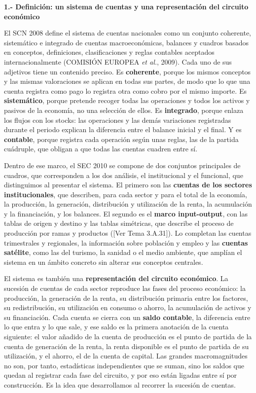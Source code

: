 \documentclass[10pt,a4paper]{article}
\newcommand{\authorfont}[1]{{\fontfamily{EBGaramond-TLF}\selectfont #1}}
\begin{document}
\textbf{1.- Definición: un sistema de cuentas y una representación del circuito económico}

El SCN 2008 define el sistema de cuentas nacionales como un conjunto coherente, sistemático e integrado de cuentas macroeconómicas, balances y cuadros basados en conceptos, definiciones, clasificaciones y reglas contables aceptados internacionalmente (COMISIÓN EUROPEA \textit{et al.}, 2009). Cada uno de sus adjetivos tiene un contenido preciso. Es \textbf{coherente}, porque los mismos conceptos y las mismas valoraciones se aplican en todas sus partes, de modo que lo que una cuenta registra como pago lo registra otra como cobro por el mismo importe. Es \textbf{sistemático}, porque pretende recoger todas las operaciones y todos los activos y pasivos de la economía, no una selección de ellos. Es \textbf{integrado}, porque enlaza los flujos con los stocks: las operaciones y las demás variaciones registradas durante el periodo explican la diferencia entre el balance inicial y el final. Y es \textbf{contable}, porque registra cada operación según unas reglas, las de la partida cuádruple, que obligan a que todas las cuentas cuadren entre sí.

Dentro de ese marco, el SEC 2010 se compone de dos conjuntos principales de cuadros, que corresponden a los dos análisis, el institucional y el funcional, que distinguimos al presentar el sistema. El primero son las \textbf{cuentas de los sectores institucionales}, que describen, para cada sector y para el total de la economía, la producción, la generación, distribución y utilización de la renta, la acumulación y la financiación, y los balances. El segundo es el \textbf{marco input-output}, con las tablas de origen y destino y las tablas simétricas, que describe el proceso de producción por ramas y productos ([\authorfont{Ver Tema 3.A.31}]). Lo completan las cuentas trimestrales y regionales, la información sobre población y empleo y las \textbf{cuentas satélite}, como las del turismo, la sanidad o el medio ambiente, que amplían el sistema en un ámbito concreto sin alterar sus conceptos centrales.

El sistema es también una \textbf{representación del circuito económico}. La sucesión de cuentas de cada sector reproduce las fases del proceso económico: la producción, la generación de la renta, su distribución primaria entre los factores, su redistribución, su utilización en consumo o ahorro, la acumulación de activos y su financiación. Cada cuenta se cierra con un \textbf{saldo contable}, la diferencia entre lo que entra y lo que sale, y ese saldo es la primera anotación de la cuenta siguiente: el valor añadido de la cuenta de producción es el punto de partida de la cuenta de generación de la renta, la renta disponible es el punto de partida de su utilización, y el ahorro, el de la cuenta de capital. Las grandes macromagnitudes no son, por tanto, estadísticas independientes que se suman, sino los saldos que quedan al registrar cada fase del circuito, y por eso están ligadas entre sí por construcción. Es la idea que desarrollamos al recorrer la sucesión de cuentas.
\end{document}
